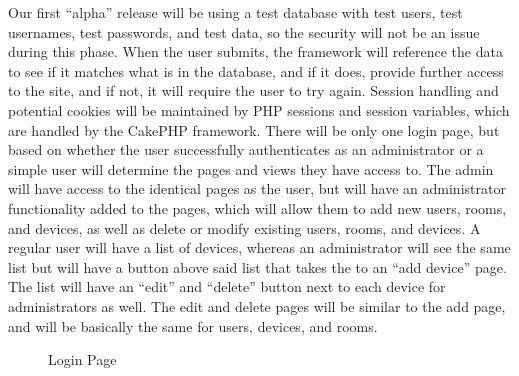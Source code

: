 \documentclass{report}
\begin{document}
Our first “alpha” release will be using a test database with test users, test usernames, test passwords, and test data, so the security will not be an issue during this phase. When the user submits, the framework will reference the data to see if it matches what is in the database, and if it does, provide further access to the site, and if not, it will require the user to try again.  Session handling and potential cookies will be maintained by PHP sessions and session variables, which are handled by the CakePHP framework. 	
\newline
\indent
There will be only one login page, but based on whether the user successfully authenticates as an administrator or a simple user will determine the pages and views they have access to.  The admin will have access to the identical pages as the user, but will have an administrator functionality added to the pages, which will allow them to add new users, rooms, and devices, as well as delete or modify existing users, rooms, and devices. A regular user will have a list of devices, whereas an administrator will see the same list but will have a button above said list that takes the to an “add device” page.  The list will have an “edit” and “delete” button next to each device for administrators as well. The edit and delete pages will be similar to the add page, and will be basically the same for users, devices, and rooms. 
\begin{figure}[H]
\caption{Login Page}
\end{figure}
\newpage
\end{document}
